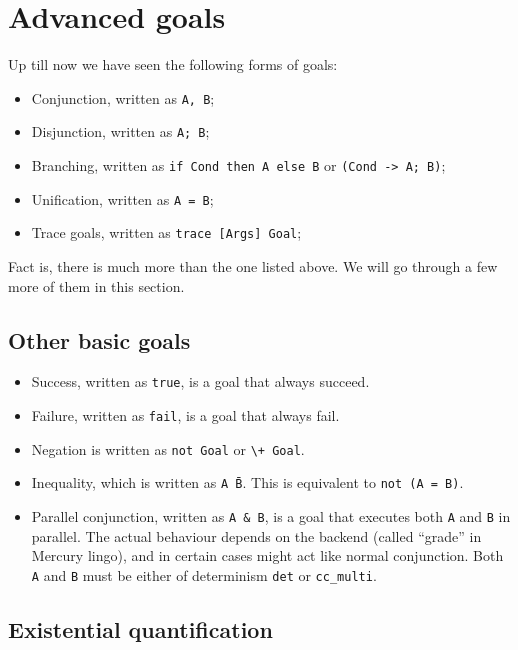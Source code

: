 \section{Advanced goals}

Up till now we have seen the following forms of goals:

\begin{itemize}
\item Conjunction, written as \texttt{A, B};
\item Disjunction, written as \texttt{A; B};
\item Branching, written as \texttt{if Cond then A else B} or \texttt{(Cond -> A; B)};
\item Unification, written as \texttt{A = B};
  \item Trace goals, written as \texttt{trace [Args] Goal};
\end{itemize}

Fact is, there is much more than the one listed above. We will go through a few more of them in this section. 

\subsection{Other basic goals}

\begin{itemize}
\item Success, written as \texttt{true}, is a goal that always succeed.
\item Failure, written as \texttt{fail}, is a goal that always fail.
\item Negation is written as \texttt{not Goal} or \texttt{\textbackslash + Goal}.
\item Inequality, which is written as \texttt{A \= B}. This is equivalent to \texttt{not (A = B)}.
  \item Parallel conjunction, written as \texttt{A \& B}, is a goal that executes both \texttt{A} and \texttt{B} in parallel. The actual behaviour depends on the backend (called ``grade'' in Mercury lingo), and in certain cases might act like normal conjunction. Both \texttt{A} and \texttt{B} must be either of determinism \texttt{det} or \texttt{cc_multi}.
\end{itemize}

\subsection{Existential quantification}

